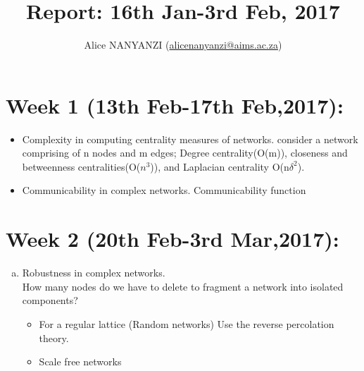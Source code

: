 \documentclass[10pt,a4paper]{article}
\author{Alice NANYANZI (\href{mailto:alicenanyanzi@aims.ac.za}{alicenanyanzi@aims.ac.za})}
\title{Report: 16th Jan-3rd Feb, 2017}
\begin{document}
\maketitle
\section*{Week 1 (13th Feb-17th Feb,2017):}

\begin{itemize}
\item Complexity in computing centrality measures of networks. consider a network comprising of n nodes and m edges; Degree centrality(O(m)), closeness and betweenness centralities(O($n^3$)), and Laplacian centrality O(n$\delta^2$).
\end{itemize}
\begin{itemize}
\item Communicability in complex networks. Communicability function 
\end{itemize}
\section*{Week 2 (20th Feb-3rd Mar,2017):}
\begin{enumerate}[a)]
\item Robustness in complex networks. \\How many nodes do we have to delete to fragment a network into isolated components?
\begin{itemize}
\item For a regular lattice (Random networks)
Use the reverse percolation theory.
\item Scale free networks

\end{itemize}


\end{enumerate}
\end{document}
